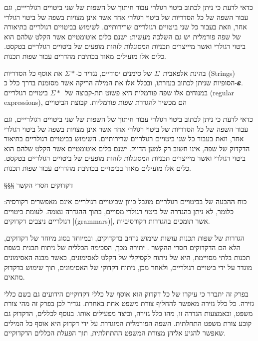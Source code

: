 כדאי לדעת כי ניתן לכתוב ביטוי רגולרי עבור חיתוך של השפות של שני ביטויים
רגולרייים, וגם עבור השפה של כל הסדריות של ביטוי רגולרי אחד אשר אינן מצויות בשפה
של ביטוי רגולרי אחר, וזאת בעבור כל שני ביטויים רגולריים שרירותיים. לשימוש
בביטויים רגולריים בתיאורה של שפה פורמלית יש גם השלכה מעשית: ישנם כלים אוטומטיים
אשר הקלט שלהם הוא ביטוי רגולרי ואשר מיייצרים תכניות המסוגלות לזהות
מופעים של ביטויים רגולריים בטקסט. כלים אלו מועילים מאוד בכתיבת מהדרים עבור שפות
תכנות.

\begin{editing}
  בהינת אלפאבית~$Σ$ של סימנים יסודיים, נגדיר כ-$Σ*$ את אוסף כל הסדריות
  (Strings) הסופיות שניתן לכתוב בעזרתו, ובכלל אלו את המילה הריקה אשר מסומנת
  בדרך כלל כ-𝜺. במנוחים אלו שפה פורמלית היא פשוט תת-קבוצה של~$Σ*$ ביטויים
  רגולריים (regular expressions), הם מכשיר להגדרת שפות פורמליות. קבוצת הביטויים

  כדאי לדעת כי ניתן לכתוב ביטוי רגולרי עבור חיתוך של השפות של שני ביטויים
  רגולרייים, וגם עבור השפה של כל הסדריות של ביטוי רגולרי אחד אשר אינן מצויות
  בשפה של ביטוי רגולרי אחר, וזאת בעבור כל שני ביטויים רגולריים שרירותיים.
  השימוש בביטויים רגולריים בתיאור הדקדוק של שפה, אינו חשוב רק למען הדיוק. ישנם
  כלים אוטומטיים אשר הקלט שלהם הוא ביטוי רגולרי ואשר מיייצרים תכניות המסוגלות
  לזהות מופעים של ביטויים רגולריים בטקסט. כלים אלו מועילים מאוד בביטויים בכתיבת
  מהדרים עבור שפות תכנות.

\end{editing}

§§§ דקדוקים חסרי הקשר

כוח ההבעה של בביטויים רגולריים מוגבל כיוון שביטויים רגולריים אינם מאפשרים
רקורסיה: כלומר, לא ניתן בהגדרה של ביטוי רגולרי מסויים, בתוך ההגדרה עצמה. לעומת
ביטויים רגולריים ניצבים דקדוקים \E|(grammars)|, אשר תומכים בהגדרות רקורסיביות.

הגדרות של שפות תכנות עושות שימוש נרחב בדקדוקים, ובמיוחד בסוג מיוחד של דקדוקים,
הלא הם הדקדוקים חסרי ההקשר . יתירה מכך, הסכימה
הכללית של ניתוח תכנית בשפת תכנות בלתי מסויימת, היא של ניתוח לקסיקלי של הקלט
לאסימונים, כאשר מבנה האסימונים מוגדר על ידי ביטויים רגולריים, ולאחר מכן, ניתוח
דקדוקי של האסימונים, תוך שימוש בדקדוק מתאים.

בפרק זה יתברר כי עיקרו של כל דקדוק הוא אוסף של כללי דקדוקיים הידועים גם בשם
כללי גזירה. כל כלל גזירה מאפשר להחליף צורת משפט אחת באחרת. נגדיר לכן בפרק זה
מהי צורת משפט, ובאמצעות הגדרה זו, מהו כלל גזירה, וכיצד מפעילים אותו. בנוסף
לכללים, הדקדוק גם קובע צורת משפט התחלתית. השפה הפורמלית המוגדרת על ידי דקדוק
היא אוסף כל המילים שאפשר להגיע אליהן מצורת המשפט ההתחלתית, תוך הפעלת הכללים
הדקדוקיים.

